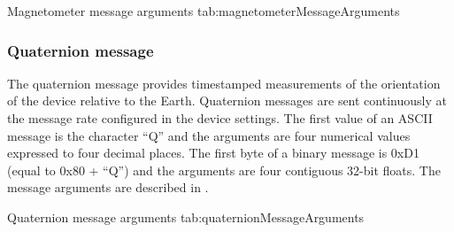 \begingroup
    \def\tempArgumentA{Magnetometer X axis in \acs{a.u.}}
    \def\tempArgumentB{Magnetometer Y axis in \acs{a.u.}}
    \def\tempArgumentC{Magnetometer Z axis in \acs{a.u.}}
    \dataMessageTable
    {Magnetometer message arguments}
    {tab:magnetometerMessageArguments}
\endgroup

\begingroup
    \def\tempNameA{Magnetometer X axis}
    \def\tempNameB{Magnetometer Y axis}
    \def\tempNameC{Magnetometer Z axis}
    \def\tempValueA{1}
    \def\tempValueB{0}
    \def\tempValueC{0}
    \def\tempAsciiFirst{M}
    \def\tempAsciiA{1.0000}
    \def\tempAsciiB{0.0000}
    \def\tempAsciiC{0.0000}
    \def\tempBinaryFirst{CD}
    \def\tempBinaryA{00 00 80 3F}
    \def\tempBinaryB{00 00 00 00}
    \def\tempBinaryC{00 00 00 00}
    \dataMessageExample
\endgroup

\subsubsection{Quaternion message}

The quaternion message provides timestamped measurements of the orientation of the device relative to the Earth.  Quaternion messages are sent continuously at the message rate configured in the device settings.  The first value of an \ac{ASCII} message is the character \enquote{Q} and the arguments are four numerical values expressed to four decimal places.  The first byte of a binary message is 0xD1 (equal to 0x80 + \enquote{Q}) and the arguments are four contiguous 32-bit floats.  The message arguments are described in .

\begingroup
    \def\tempArgumentA{Quaternion W element}
    \def\tempArgumentB{Quaternion X element}
    \def\tempArgumentC{Quaternion Y element}
    \def\tempArgumentD{Quaternion Z element}
    \def\tempCaption{Quaternion message arguments}
    \def\tempLabel{tab:quaternionMessageArguments}
    \dataMessageTable
    {Quaternion message arguments}
    {tab:quaternionMessageArguments}
\endgroup

\begingroup
    \def\tempNameA{Quaternion W element}
    \def\tempNameB{Quaternion X element}
    \def\tempNameC{Quaternion Y element}
    \def\tempNameD{Quaternion Z element}
    \def\tempValueA{1}
    \def\tempValueB{0}
    \def\tempValueC{0}
    \def\tempValueD{0}
    \def\tempAsciiFirst{Q}
    \def\tempAsciiA{1.0000}
    \def\tempAsciiB{0.0000}
    \def\tempAsciiC{0.0000}
    \def\tempAsciiD{0.0000}
    \def\tempBinaryFirst{D1}
    \def\tempBinaryA{00 00 80 3F}
    \def\tempBinaryB{00 00 00 00}
    \def\tempBinaryC{00 00 00 00}
    \def\tempBinaryD{00 00 00 00}
    \dataMessageExample
\endgroup

